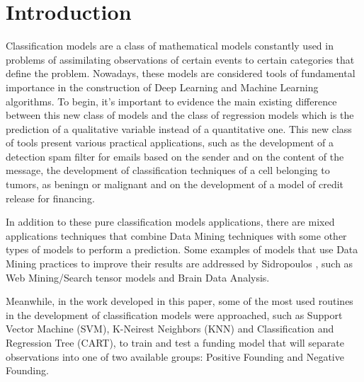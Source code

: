 \section{Introduction}



Classification models are a class of mathematical models constantly used in problems of
assimilating observations of certain events to certain categories that define the problem.
Nowadays, these models are considered tools of fundamental importance in the construction 
of Deep Learning and Machine Learning algorithms. To begin, it's important to evidence 
the main existing difference between this new class of models and the class of 
regression models which is the prediction of a qualitative variable instead of a quantitative
one. This new class of tools present various practical applications, such as the 
development of a detection spam filter for emails based on the sender and on the content
of the message, the development of classification techniques of a cell belonging to tumors, 
as beningn or malignant and on the development of a model of credit release for financing.

In addition to these pure classification models applications, there are mixed applications 
techniques that combine Data Mining techniques with some other types of models to perform
a prediction. Some examples of models that use Data Mining practices to improve their 
results are addressed by Sidropoulos , such as Web Mining/Search 
tensor models and Brain Data Analysis. 

Meanwhile, in the work developed in this paper, some of the most used routines in the
development of classification models were approached, such as Support Vector Machine (SVM),
K-Neirest Neighbors (KNN) \cite{Patrick} and Classification and Regression Tree (CART), to train and 
test a funding model that will separate observations into one of two available groups:
Positive Founding and Negative Founding.

